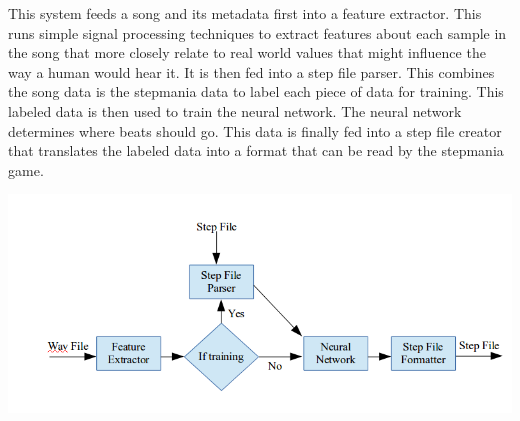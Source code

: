 This system feeds a song and its metadata first into a feature extractor. This runs simple signal processing techniques to extract features about each sample in the song that more closely relate to real world values that might influence the way a human would hear it. It is then fed into a step file parser. This combines the song data is the stepmania data to label each piece of data for training. This labeled data is then used to train the neural network. The neural network determines where beats should go. This data is finally fed into a step file creator that translates the labeled data into a format that can be read by the stepmania game.
\begin{center}
	\includegraphics[scale=0.55]{data-flow.png}
\end{center}
